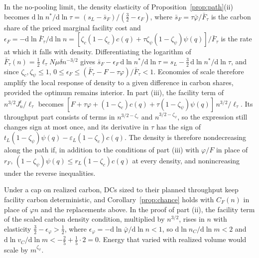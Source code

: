 \documentclass[11pt]{article}
\numberwithin{proposition}{section}
\theoremstyle{definition}
\theoremstyle{remark}
\theoremstyle{plain}
\begin{document}
In the no-pooling limit, the density elasticity of Proposition~\ref{prop:path}(ii) becomes
$\mathrm d\ln n^*/\mathrm d\ln\tau=(s_L-\bar s_F)/(\tfrac32-\epsilon_F)$, where $\bar s_F=\tau\bar\varphi/\bar
F_\tau$ is the carbon share of the priced marginal facility cost and
$\epsilon_F=-\mathrm d\ln\bar F_\tau/\mathrm d\ln n=[\zeta_c(1-\zeta_c)c(q)+\tau\zeta_\psi(1-\zeta_\psi)\psi(q)]/\bar
F_\tau$ is the rate at which it falls with density. Differentiating the logarithm of $\bar
F_\tau(n)=\tfrac12\ell_\tau N\mu\delta n^{-3/2}$ gives $\bar s_F-\epsilon_F\,\mathrm d\ln n^*/\mathrm d\ln\tau=
s_L-\tfrac32\,\mathrm d\ln n^*/\mathrm d\ln\tau$, and since $\zeta_c,\zeta_\psi\le1$,
$0\le\epsilon_F\le(\bar F_\tau-F-\tau\varphi)/\bar F_\tau<1$. Economies of scale therefore amplify the local
response of density to a given difference in carbon shares, provided the optimum remains interior. In part (iii),
the facility term of $n^{3/2}J^{\mathrm r}_n/\ell_\tau$ becomes $[F+\tau\varphi+(1-\zeta_c)c(q)+\tau(1-\zeta_\psi)
\psi(q)]\,n^{3/2}/\ell_\tau$. Its throughput part consists of terms in $n^{3/2-\zeta_c}$ and $n^{3/2-\zeta_\psi}$,
so the expression still changes sign at most once, and its derivative in $\tau$ has the sign of
$t_L(1-\zeta_\psi)\psi(q)-\varepsilon_L(1-\zeta_c)c(q)$. The density is therefore nondecreasing along the path if,
in addition to the conditions of part (iii) with $\varphi/F$ in place of $r_F$, $(1-\zeta_\psi)\psi(q)\le
r_L(1-\zeta_c)c(q)$ at every density, and nonincreasing under the reverse inequalities.

Under a cap on realized carbon, DCs sized to their planned throughput keep facility carbon deterministic, and
Corollary~\ref{prop:chance} holds with $C_F(n)$ in place of $\varphi n$ and the replacements above. In the
proof of part (ii), the facility
term of the scaled carbon density condition, multiplied by $n^{3/2}$, rises in $n$ with elasticity
$\tfrac32-\epsilon_\varphi>\tfrac12$, where $\epsilon_\varphi=-\mathrm d\ln\bar\varphi/\mathrm d\ln n<1$, so
$\mathrm d\ln n_C/\mathrm d\ln m<2$ and $\mathrm d\ln v_C/\mathrm d\ln m<-\tfrac25+\tfrac15\cdot2=0$. Energy that varied with realized volume would scale by $m^{\zeta_\psi}$.
\end{document}
